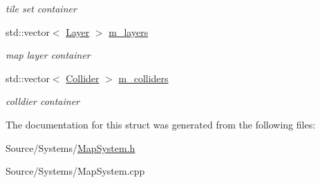 \begin{DoxyCompactItemize}
\begin{DoxyCompactList}\small\item\em tile set container \end{DoxyCompactList}\item 
\mbox{\label{struct_map_system_1_1_tile_map_a0e6d02d8a492c351d8734a79657721ca}} 
std\+::vector$<$ \mbox{\hyperlink{struct_map_system_1_1_layer}{Layer}} $>$ \mbox{\hyperlink{struct_map_system_1_1_tile_map_a0e6d02d8a492c351d8734a79657721ca}{m\+\_\+layers}}
\begin{DoxyCompactList}\small\item\em map layer container \end{DoxyCompactList}\item 
\mbox{\label{struct_map_system_1_1_tile_map_aa1a9c321c596648dc6feb0f07350a0e0}} 
std\+::vector$<$ \mbox{\hyperlink{struct_map_system_1_1_collider}{Collider}} $>$ \mbox{\hyperlink{struct_map_system_1_1_tile_map_aa1a9c321c596648dc6feb0f07350a0e0}{m\+\_\+colliders}}
\begin{DoxyCompactList}\small\item\em colldier container \end{DoxyCompactList}\end{DoxyCompactItemize}


The documentation for this struct was generated from the following files\+:\begin{DoxyCompactItemize}
\item 
Source/\+Systems/\mbox{\hyperlink{_map_system_8h}{Map\+System.\+h}}\item 
Source/\+Systems/Map\+System.\+cpp\end{DoxyCompactItemize}
